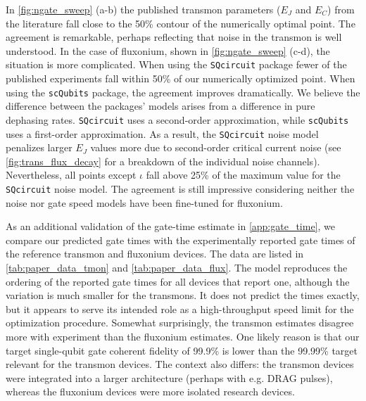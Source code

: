 In \cref{fig:ngate_sweep} (a-b) the published transmon parameters ($E_J$ and $E_C$) from the literature fall close to the 50\% contour of the numerically optimal point. The agreement is remarkable, perhaps reflecting that noise in the transmon is well understood. In the case of fluxonium, shown in \cref{fig:ngate_sweep} (c-d), the situation is more complicated.
When using the \texttt{SQcircuit} package
fewer of the published experiments fall within 50\% of our numerically optimized point. When using the \texttt{scQubits} package, the agreement improves dramatically. We believe the difference between the packages' models arises from a difference in pure dephasing rates. \texttt{SQcircuit} uses a second-order approximation, while \texttt{scQubits} uses a first-order approximation. As a result, the \texttt{SQcircuit} noise model penalizes larger $E_J$ values more due to second-order critical current noise (see \cref{fig:trans_flux_decay} for a breakdown of the individual noise channels). Nevertheless, all points except $\iota$ fall above 25\% of the maximum value for the \texttt{SQcircuit} noise model. The agreement is still impressive considering neither the noise nor gate speed models have been fine-tuned for fluxonium.


As an additional validation of the gate-time estimate in \cref{app:gate_time}, we compare our predicted gate times with the experimentally reported gate times of the reference transmon and fluxonium devices. The data are listed in \cref{tab:paper_data_tmon} and \cref{tab:paper_data_flux}. The model reproduces the ordering of the reported gate times for all devices that report one, although the variation is much smaller for the transmons. It does not predict the times exactly, but it appears to serve its intended role as a high-throughput speed limit for the optimization procedure. Somewhat surprisingly, the transmon estimates disagree more with experiment than the fluxonium estimates. One likely reason is that our target single-qubit gate coherent fidelity of 
99.9\% is lower than the 
99.99\% target relevant for the transmon devices. The context also differs: the transmon devices were integrated into a larger architecture (perhaps with e.g. DRAG pulses), whereas the fluxonium devices were more isolated research devices.




